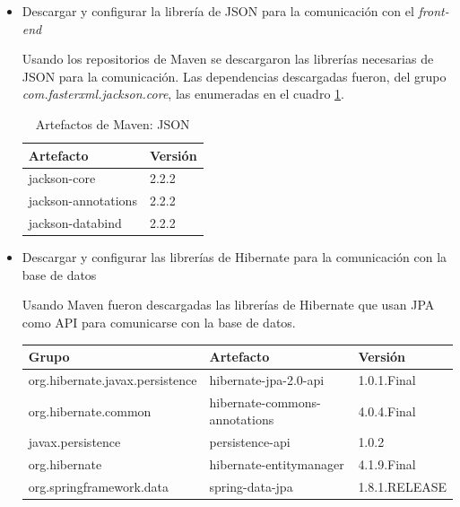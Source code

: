 \begin{enumerate}
\begin{itemize}
           
           \item Descargar y configurar la librería de JSON para la comunicación con el \textit{front-end}
           
           Usando los repositorios de Maven se descargaron las librerías necesarias de JSON para la comunicación. Las dependencias descargadas fueron, del grupo \textit{com.fasterxml.jackson.core}, las enumeradas en el cuadro \ref{artefactos-json}.
           
           \begin{table}[h!]
               
               \begin{center}
                    \begin{tabular}{|l|l|}\hline
                       Artefacto & Versión \\\hline
                       jackson-core & 2.2.2 \\\hline
                       jackson-annotations & 2.2.2 \\\hline
                       jackson-databind & 2.2.2 \\\hline                   
                    \end{tabular}
                \end{center}
                
                \caption{Artefactos de Maven: JSON}
                \label{artefactos-json}
            \end{table}
           
           \item Descargar y configurar las librerías de Hibernate para la comunicación con la base de datos
           
           Usando Maven fueron descargadas las librerías de Hibernate que usan JPA como API para comunicarse con la base de datos.
           
           \begin{table}[h!]
               
               \begin{center}
                   \begin{tabular}{|l|l|l|}\hline
                       Grupo & Artefacto & Versión \\\hline
                       org.hibernate.javax.persistence & hibernate-jpa-2.0-api & 1.0.1.Final \\\hline
                       org.hibernate.common & hibernate-commons-annotations & 4.0.4.Final \\\hline
                       javax.persistence & persistence-api & 1.0.2 \\\hline
                       org.hibernate & hibernate-entitymanager & 4.1.9.Final \\\hline
                       org.springframework.data & spring-data-jpa & 1.8.1.RELEASE \\\hline
                    \end{tabular}
                \end{center}
                

\end{table}
\end{itemize}
\end{enumerate}
